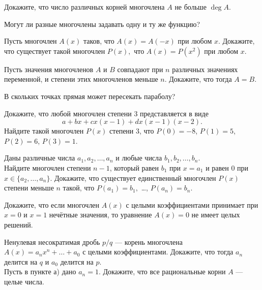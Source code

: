 \documentclass[a4paper,12pt]{article}
\newcommand{\0}[1]{\overline{#1}}
\begin{document}
 Докажите, что число различных корней многочлена $A$ не больше
$\deg A.$

Могут ли разные многочлены задавать одну и ту же функцию?

 Пусть многочлен $A(x)$ таков, что $A(x)=A(-x)$ при любом $x$.
Докажите, что  существует такой многочлен $P(x),$ что
$A(x)=P(x^2)$ при любом $x$.



 Пусть значения многочленов $A$ и $B$
совпадают при $n$ различных значениях переменной, и степени
этих многочленов меньше $n$. Докажите, что тогда $A=B.$

В скольких точках прямая может пересекать параболу?



  Докажите, что  любой многочлен степени 3
представляется в виде
$$a+bx+cx(x-1)+dx(x-1)(x-2).$$
 Найдите такой многочлен $P(x)$ степени 3,
что $P(0)=-8$, $P(1)=5$, $P(2)=6$, $P(3)=1$.

Даны различные числа $a_1,a_2,\dots ,a_n$ и любые числа $b_1,b_2,\dots ,b_n$.\\
Найдите многочлен степени $n-1$, который равен $b_1$ при $x=a_1$ и равен 0 при $x\in\{a_2,\dots,a_n\}$.
Докажите, что существует единственный многочлен $P(x)$ степени
меньше $n$ такой, что $P(a_1)=b_1,$  \dots , $P(a_n)=b_n.$









  Докажите, что  если многочлен $A(x)$ с целыми коэффициентами
принимает при $x=0$ и $x=1$ неч\"етные значения, то уравнение $A(x)=0$
не имеет целых решений.

  Ненулевая несократимая дробь $p/q$ --- корень многочлена
$A(x)=a_nx^n + \dots + a_0$ с целыми коэффициентами.
Докажите, что  тогда $a_n$ делится на $q$
и $a_0$ делится на $p$.\\
 Пусть в пункте а) дано $a_n=1$. Докажите, что
все рациональные корни $A$ --- целые числа.
\end{document}
